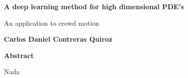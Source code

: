 

\fancyhf{} %
\fancyhead[RO,R]{\thepage} %
\renewcommand{\headrulewidth}{0pt}

\begin{center}
    \Large
    \textbf{A deep learning method for high dimensional PDE's}
    
    \vspace{0.4cm}
    \large
    An application to crowd motion
    
    \vspace{0.4cm}
    \textbf{Carlos Daniel Contreras Quiroz}
    
    \vspace{0.9cm}
    \textbf{Abstract}
\end{center}
Nada